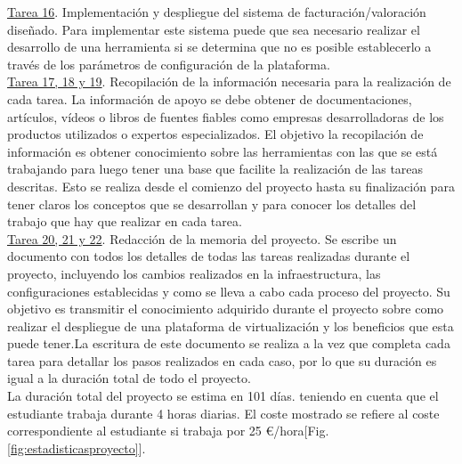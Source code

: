 \underline{Tarea 16}. Implementación y despliegue del sistema de facturación/valoración diseñado. Para implementar este sistema puede que sea necesario realizar el desarrollo de una herramienta si se determina que no es posible establecerlo a través de los parámetros de configuración de la plataforma. \\

\underline{Tarea 17, 18 y 19}. Recopilación de la información necesaria para la realización de cada tarea. La información de apoyo se debe obtener de documentaciones, artículos, vídeos o libros de  fuentes fiables como empresas desarrolladoras de los productos utilizados o expertos especializados. El objetivo la recopilación de información es obtener conocimiento sobre las herramientas con las que se está trabajando para luego tener una base que facilite la realización de las tareas descritas. Esto se realiza desde el comienzo del proyecto hasta su finalización para tener claros los conceptos que se desarrollan y para conocer los detalles del trabajo que hay que realizar en cada tarea.\\

\underline{Tarea 20, 21 y 22}. Redacción de la memoria del proyecto. Se escribe un documento con todos los detalles de todas las tareas realizadas durante el proyecto, incluyendo los cambios realizados en la infraestructura, las configuraciones establecidas y como se lleva a cabo cada proceso del proyecto. Su objetivo es transmitir el conocimiento adquirido durante el proyecto sobre como realizar el despliegue de una plataforma de virtualización y los beneficios que esta puede tener.La escritura de este documento se realiza a la vez que completa cada tarea para detallar los pasos realizados en cada caso, por lo que su duración es igual a la duración total de todo el proyecto.\\


La duración total del proyecto se estima en 101 días. teniendo en cuenta que el estudiante trabaja durante 4 horas diarias. El coste mostrado se refiere al coste correspondiente al estudiante si trabaja por 25 €/hora[Fig. \ref{fig:estadisticasproyecto}]. 

